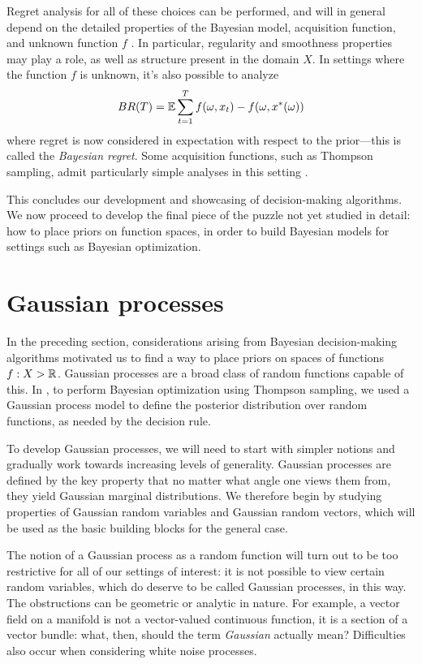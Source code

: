 \documentclass[11pt]{book}
\begin{document}
Regret analysis for all of these choices can be performed, and will in general depend on the detailed properties of the Bayesian model, acquisition function, and unknown function $f$ \cite{srinivas09}.
In particular, regularity and smoothness properties may play a role, as well as structure present in the domain $X$.
In settings where the function $f$ is unknown, it's also possible to analyze
\[
BR(T) = \operatorname{\mathbb{E}} \sum_{t=1}^T f(\omega,x_t) - f(\omega,x^*(\omega))    
\]
where regret is now considered in expectation with respect to the prior---this is called the \emph{Bayesian regret}.
Some acquisition functions, such as Thompson sampling, admit particularly simple analyses in this setting \cite{lattimore20}.

This concludes our development and showcasing of decision-making algorithms.
We now proceed to develop the final piece of the puzzle not yet studied in detail: how to place priors on function spaces, in order to build Bayesian models for settings such as Bayesian optimization.

\section{Gaussian processes}

In the preceding section, considerations arising from Bayesian decision-making algorithms motivated us to find a way to place priors on spaces of functions $f : X \-> \mathbb{R}$.
Gaussian processes are a broad class of random functions capable of this.
In , to perform Bayesian optimization using Thompson sampling, we used a Gaussian process model to define the posterior distribution over random functions, as needed by the decision rule.

To develop Gaussian processes, we will need to start with simpler notions and gradually work towards increasing levels of generality.
Gaussian processes are defined by the key property that no matter what angle one views them from, they yield Gaussian marginal distributions.
We therefore begin by studying properties of Gaussian random variables and Gaussian random vectors, which will be used as the basic building blocks for the general case.

The notion of a Gaussian process as a random function will turn out to be too restrictive for all of our settings of interest: it is not possible to view certain random variables, which do deserve to be called Gaussian processes, in this way.
The obstructions can be geometric or analytic in nature.
For example, a vector field on a manifold is not a vector-valued continuous function, it is a section of a vector bundle: what, then, should the term \emph{Gaussian} actually mean?
Difficulties also occur when considering white noise processes.
\end{document}
